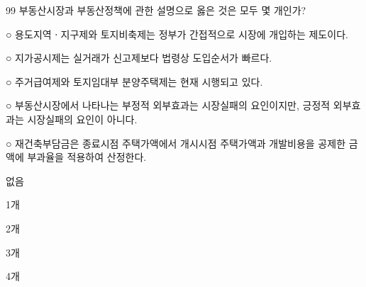\begin{question}{99}
부동산시장과 부동산정책에 관한 설명으로 옳은 것은 모두 몇 개인가?
\begin{framedtext}
○ 용도지역ㆍ지구제와 토지비축제는 정부가 간접적으로 시장에 개입하는 제도이다. \par
○ 지가공시제는 실거래가 신고제보다 법령상 도입순서가 빠르다. \par
○ 주거급여제와 토지임대부 분양주택제는 현재 시행되고 있다. \par
○ 부동산시장에서 나타나는 부정적 외부효과는 시장실패의 요인이지만, 긍정적 외부효과는 시장실패의 요인이 아니다. \par
○ 재건축부담금은 종료시점 주택가액에서 개시시점 주택가액과 개발비용을 공제한 금액에 부과율을 적용하여 산정한다. \par
\end{framedtext}
\begin{choices}
  \item 없음
  \item 1개
  \item 2개
  \item 3개
  \item 4개
\end{choices}
\end{question}
